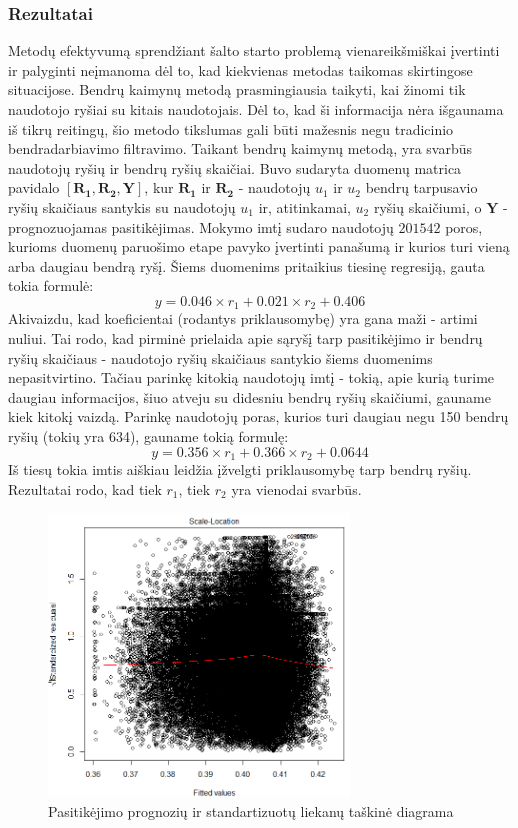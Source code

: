 \documentclass{VUMIFInfMagistrinis}
\begin{document}
\subsubsection{Rezultatai}
\indent
Metodų efektyvumą sprendžiant šalto starto problemą vienareikšmiškai įvertinti ir palyginti neįmanoma dėl to, kad kiekvienas metodas taikomas skirtingose situacijose. Bendrų kaimynų metodą prasmingiausia taikyti, kai žinomi tik naudotojo ryšiai su kitais naudotojais. Dėl to, kad ši informacija nėra išgaunama iš tikrų reitingų, šio metodo tikslumas gali būti mažesnis negu tradicinio bendradarbiavimo filtravimo.
\newline
\indent
Taikant bendrų kaimynų metodą, yra svarbūs naudotojų ryšių ir bendrų ryšių skaičiai. Buvo sudaryta duomenų matrica pavidalo $[ \boldsymbol{R_1}, \boldsymbol{R_2},  \boldsymbol{Y}]$, kur $\boldsymbol{R_1}$ ir $\boldsymbol{R_2}$ - naudotojų $u_1$ ir $u_2$ bendrų tarpusavio ryšių skaičiaus santykis su naudotojų $u_1$ ir, atitinkamai, $u_2$ ryšių skaičiumi, o $\boldsymbol{Y}$ - prognozuojamas pasitikėjimas. Mokymo imtį sudaro naudotojų $201542$ poros, kurioms duomenų paruošimo etape pavyko įvertinti panašumą ir kurios turi vieną arba daugiau bendrą ryšį. Šiems duomenims pritaikius tiesinę regresiją, gauta tokia formulė:
\begin{equation}\label{eq:CN_all}
y = 0.046 \times r_1 + 0.021 \times r_2 + 0.406
\end{equation}
Akivaizdu, kad koeficientai (rodantys priklausomybę)  yra gana maži - artimi nuliui. Tai rodo, kad pirminė prielaida apie sąryšį tarp pasitikėjimo ir bendrų ryšių skaičiaus - naudotojo ryšių skaičiaus santykio šiems duomenims nepasitvirtino. Tačiau parinkę kitokią naudotojų imtį - tokią, apie kurią turime daugiau informacijos, šiuo atveju su didesniu bendrų ryšių skaičiumi, gauname kiek kitokį vaizdą. Parinkę naudotojų poras, kurios turi daugiau negu 150 bendrų ryšių (tokių yra 634), gauname tokią formulę:
\begin{equation}\label{eq:CN_150}
y = 0.356 \times r_1 + 0.366 \times r_2 + 0.0644
\end{equation}
\newline
Iš tiesų tokia imtis aiškiau leidžia įžvelgti priklausomybę tarp bendrų ryšių. Rezultatai rodo, kad tiek $r_1$, tiek $r_2$ yra vienodai svarbūs.
\indent
\begin{figure}[ht!]
	\centering
	\includegraphics[width=80mm]{CN_residuals.png}
	\caption{Pasitikėjimo prognozių ir standartizuotų liekanų taškinė diagrama} \label{CN_residuals}
\end{figure}
\end{document}
